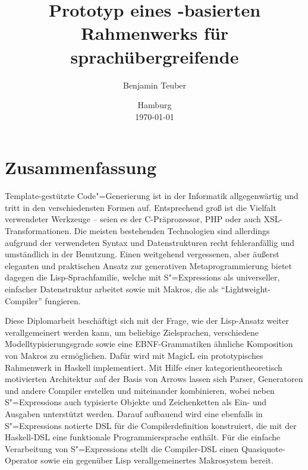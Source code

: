 \documentclass[12pt, a4paper, bibgerm]{scrbook}
\title{Prototyp eines \sexp{}-basierten\\Rahmenwerks für
  sprachübergreifende \\\mprog{}}
\author{Benjamin Teuber}
\date{Hamburg\\\today}
\newcommand{\sexps}{S"=Expressions}
\newcommand{\cgen}{Code"=Generierung}
\newcommand{\mprog}{Metaprogrammierung}
\begin{document}
\thispagestyle{empty}

\cleardoublepage


\section*{\centering Zusammenfassung}
Template-gestützte \cgen{} ist in der Informatik allgegenwärtig und
tritt in den verschiedensten Formen auf. Entsprechend groß ist die
Vielfalt verwendeter Werkzeuge -- seien es der C-Präprozessor, PHP oder
auch XSL-Transformationen. Die meisten bestehenden Technologien sind
allerdings aufgrund der verwendeten Syntax und Datenstrukturen recht
fehleranfällig und umständlich in der Benutzung. Einen weitgehend
vergessenen, aber äußerst eleganten und praktischen Ansatz zur
generativen \mprog{} bietet dagegen die Lisp-Sprachfamilie, welche mit
\sexps{} als universeller, einfacher Datenstruktur arbeitet sowie mit
Makros, die als "`Lightweight-Compiler"' fungieren.

Diese Diplomarbeit beschäftigt sich mit der Frage, wie der Lisp-Ansatz
weiter verallgemeinert werden kann, um beliebige Zielsprachen,
verschiedene Modelltypisierungsgrade sowie eine EBNF-Grammatiken
ähnliche Komposition von Makros zu ermöglichen. Dafür wird mit MagicL
ein prototypisches Rahmenwerk in Haskell implementiert. Mit Hilfe einer
kategorientheoretisch motivierten Architektur auf der Basis von Arrows
lassen sich Parser, Generatoren und andere Compiler erstellen und
miteinander kombinieren, wobei neben \sexps{} auch typisierte Objekte
und Zeichenketten als Ein- und Ausgaben unterstützt werden. Darauf
aufbauend wird eine ebenfalls in \sexps{} notierte DSL für die
Compilerdefinition konstruiert, die mit der Haskell-DSL eine funktionale
Programmiersprache enthält. Für die einfache Verarbeitung von \sexps{}
stellt die Compiler-DSL einen Quasiquote-Operator sowie ein gegenüber
Lisp verallgemeinertes Makrosystem bereit.
\end{document}
